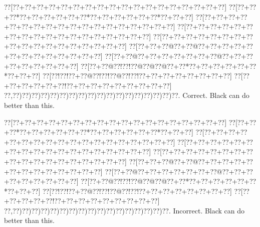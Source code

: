 \documentclass[a5paper]{article}
\begin{document}
\begin{center}
{\goo
\0??[\0??+\0??+\0??+\0??+\0??+\0??+\0??+\0??+\0??+\0??+\0??+\0??+\0??+\0??+\0??+\0??+\0??+\0??]
\0??[\0??+\0??+\0??*\0??+\0??+\0??+\0??+\0??+\0??*\0??+\0??+\0??+\0??+\0??+\0??*\0??+\0??+\0??]
\0??[\0??+\0??+\0??+\0??+\0??+\0??+\0??+\0??+\0??+\0??+\0??+\0??+\0??+\0??+\0??+\0??+\0??+\0??]
\0??[\0??+\0??+\0??+\0??+\0??+\0??+\0??+\0??+\0??+\0??+\0??+\0??+\0??+\0??+\0??+\0??+\0??+\0??]
\0??[\0??+\0??+\0??+\0??+\0??+\0??+\0??+\0??+\0??+\0??+\0??+\0??+\0??+\0??+\0??+\0??+\0??+\0??]
\0??[\0??+\0??+\0??@\0??+\0??@\0??+\0??+\0??+\0??+\0??+\0??+\0??+\0??+\0??+\0??+\0??+\0??+\0??]
\0??[\0??+\0??@\0??+\0??+\0??+\0??+\0??+\0??+\0??@\0??+\0??+\0??+\0??+\0??+\0??+\0??+\0??+\0??]
\0??[\0??+\0??@\0??!\0??!\0??@\0??@\0??@\0??+\0??*\0??+\0??+\0??+\0??+\0??+\0??*\0??+\0??+\0??]
\0??[\0??!\0??!\0??+\0??@\0??!\0??!\0??@\0??!\0??!\0??+\0??+\0??+\0??+\0??+\0??+\0??+\0??]
\0??[\0??+\0??+\0??+\0??+\0??+\0??!\0??+\0??+\0??+\0??+\0??+\0??+\0??+\0??+\0??]
\0??,\0??)\0??)\0??)\0??)\0??)\0??)\0??)\0??)\0??)\0??)\0??)\0??)\0??)\0??)\0??)\0??)\0??)\0??.
}
Correct. Black can do better than this.

\end{center}
\begin{center}
{\goo
\0??[\0??+\0??+\0??+\0??+\0??+\0??+\0??+\0??+\0??+\0??+\0??+\0??+\0??+\0??+\0??+\0??+\0??+\0??]
\0??[\0??+\0??+\0??*\0??+\0??+\0??+\0??+\0??+\0??*\0??+\0??+\0??+\0??+\0??+\0??*\0??+\0??+\0??]
\0??[\0??+\0??+\0??+\0??+\0??+\0??+\0??+\0??+\0??+\0??+\0??+\0??+\0??+\0??+\0??+\0??+\0??+\0??]
\0??[\0??+\0??+\0??+\0??+\0??+\0??+\0??+\0??+\0??+\0??+\0??+\0??+\0??+\0??+\0??+\0??+\0??+\0??]
\0??[\0??+\0??+\0??+\0??+\0??+\0??+\0??+\0??+\0??+\0??+\0??+\0??+\0??+\0??+\0??+\0??+\0??+\0??]
\0??[\0??+\0??+\0??@\0??+\0??@\0??+\0??+\0??+\0??+\0??+\0??+\0??+\0??+\0??+\0??+\0??+\0??+\0??]
\0??[\0??+\0??@\0??+\0??+\0??+\0??+\0??+\0??+\0??@\0??+\0??+\0??+\0??+\0??+\0??+\0??+\0??+\0??]
\0??[\0??+\0??@\0??!\0??!\0??@\0??@\0??@\0??+\0??*\0??+\0??+\0??+\0??+\0??+\0??*\0??+\0??+\0??]
\0??[\0??!\0??!\0??+\0??@\0??!\0??!\0??@\0??!\0??!\0??+\0??+\0??+\0??+\0??+\0??+\0??+\0??]
\0??[\0??+\0??+\0??+\0??+\0??!\0??+\0??+\0??+\0??+\0??+\0??+\0??+\0??+\0??]
\0??,\0??)\0??)\0??)\0??)\0??)\0??)\0??)\0??)\0??)\0??)\0??)\0??)\0??)\0??)\0??)\0??)\0??.
}
Incorrect. Black can do better than this.

\end{center}
\newpage
\end{document}
